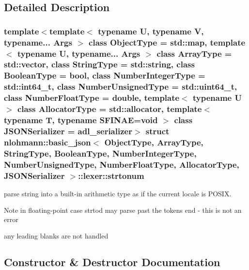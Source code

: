 \subsection{Detailed Description}
\subsubsection*{template$<$template$<$ typename U, typename V, typename... Args $>$ class Object\+Type = std\+::map, template$<$ typename U, typename... Args $>$ class Array\+Type = std\+::vector, class String\+Type = std\+::string, class Boolean\+Type = bool, class Number\+Integer\+Type = std\+::int64\+\_\+t, class Number\+Unsigned\+Type = std\+::uint64\+\_\+t, class Number\+Float\+Type = double, template$<$ typename U $>$ class Allocator\+Type = std\+::allocator, template$<$ typename T, typename S\+F\+I\+N\+A\+E=void $>$ class J\+S\+O\+N\+Serializer = adl\+\_\+serializer$>$\newline
struct nlohmann\+::basic\+\_\+json$<$ Object\+Type, Array\+Type, String\+Type, Boolean\+Type, Number\+Integer\+Type, Number\+Unsigned\+Type, Number\+Float\+Type, Allocator\+Type, J\+S\+O\+N\+Serializer $>$\+::lexer\+::strtonum}

parse string into a built-\/in arithmetic type as if the current locale is P\+O\+S\+IX. 

\begin{DoxyNote}{Note}
in floating-\/point case strtod may parse past the token\textquotesingle{}s end -\/ this is not an error

any leading blanks are not handled 
\end{DoxyNote}


\subsection{Constructor \& Destructor Documentation}
\mbox{\label{structnlohmann_1_1basic__json_1_1lexer_1_1strtonum_ae065098e24b08ea79a359950190006d8}} 
